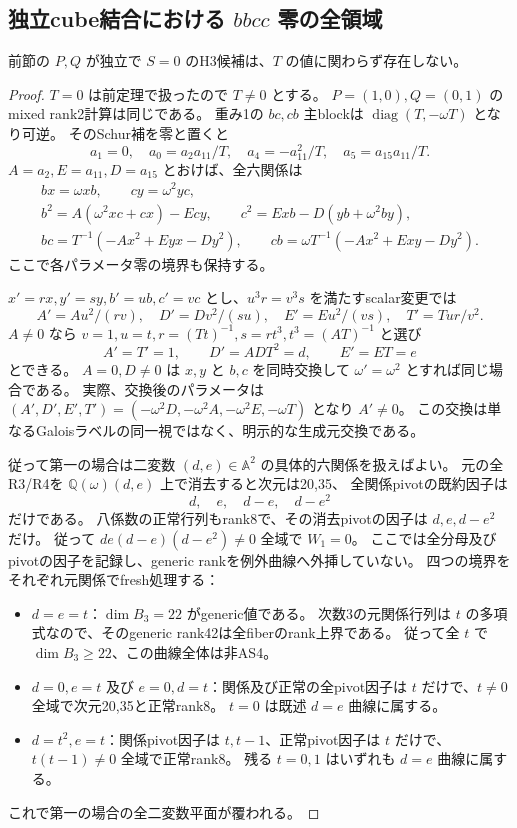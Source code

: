 \subsection{独立cube結合における $bbcc$ 零の全領域}
\label{subsec:cubic-third-root-unit-independent-Szero}
\begin{theorem}[独立結合かつ $S=0$ の全排除]
\label{thm:cubic-third-root-unit-independent-Szero-empty}
前節の $P,Q$ が独立で $S=0$ のH3候補は、$T$ の値に関わらず存在しない。
\end{theorem}
\begin{proof}
$T=0$ は前定理で扱ったので $T\ne0$ とする。
$P=(1,0),Q=(0,1)$ のmixed rank2計算は同じである。
重み1の $bc,cb$ 主blockは $\operatorname{diag}(T,-\omega T)$ となり可逆。
そのSchur補を零と置くと
\[
 a_1=0,\quad a_0=a_2a_{11}/T,\quad
 a_4=-a_{11}^2/T,\quad a_5=a_{15}a_{11}/T.
\]
$A=a_2,E=a_{11},D=a_{15}$ とおけば、全六関係は
\begin{gather*}
 bx=\omega xb,\qquad cy=\omega^2yc,\\
 b^2=A(\omega^2xc+cx)-Ecy,\qquad
 c^2=Exb-D(yb+\omega^2by),\\
 bc=T^{-1}(-Ax^2+Eyx-Dy^2),\qquad
 cb=\omega T^{-1}(-Ax^2+Exy-Dy^2).
\end{gather*}
ここで各パラメータ零の境界も保持する。

$x'=rx,y'=sy,b'=ub,c'=vc$ とし、$u^3r=v^3s$ を満たすscalar変更では
\[
 A'=Au^2/(rv),\quad D'=Dv^2/(su),\quad
 E'=Eu^2/(vs),\quad T'=Tur/v^2.
\]
$A\ne0$ なら $v=1,u=t,r=(Tt)^{-1},s=rt^3,t^3=(AT)^{-1}$ と選び
\[
 A'=T'=1,\qquad D'=ADT^2=d,\qquad E'=ET=e
\]
とできる。
$A=0,D\ne0$ は $x,y$ と $b,c$ を同時交換して $\omega'=\omega^2$ とすれば同じ場合である。
実際、交換後のパラメータは
$(A',D',E',T')=(-\omega^2D,-\omega^2A,-\omega^2E,-\omega T)$ となり $A'\ne0$。
この交換は単なるGaloisラベルの同一視ではなく、明示的な生成元交換である。

従って第一の場合は二変数 $(d,e)\in\mathbb A^2$ の具体的六関係を扱えばよい。
元の全R3/R4を $\mathbb Q(\omega)(d,e)$ 上で消去すると次元は20,35、
全関係pivotの既約因子は
\[
 d,\quad e,\quad d-e,\quad d-e^2
\]
だけである。
八係数の正常行列もrank8で、その消去pivotの因子は $d,e,d-e^2$ だけ。
従って $de(d-e)(d-e^2)\ne0$ 全域で $W_1=0$。
ここでは全分母及びpivotの因子を記録し、generic rankを例外曲線へ外挿していない。
四つの境界をそれぞれ元関係でfresh処理する：
\begin{itemize}
\item $d=e=t$：$\dim B_3=22$ がgeneric値である。
次数3の元関係行列は $t$ の多項式なので、そのgeneric rank42は全fiberのrank上界である。
従って全 $t$ で $\dim B_3\ge22$、この曲線全体は非AS4。
\item $d=0,e=t$ 及び $e=0,d=t$：関係及び正常の全pivot因子は $t$ だけで、$t\ne0$ 全域で次元20,35と正常rank8。
$t=0$ は既述 $d=e$ 曲線に属する。
\item $d=t^2,e=t$：関係pivot因子は $t,t-1$、正常pivot因子は $t$ だけで、$t(t-1)\ne0$ 全域で正常rank8。
残る $t=0,1$ はいずれも $d=e$ 曲線に属する。
\end{itemize}
これで第一の場合の全二変数平面が覆われる。


\end{proof}
